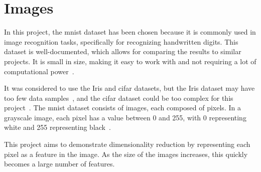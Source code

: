 \section{Images}\label{sec:images}
In this project, the \gls{mnist} dataset has been chosen because it is commonly used in image recognition tasks, specifically for recognizing handwritten digits. This dataset is well-documented, which allows for comparing the results to similar projects. It is small in size, making it easy to work with and not requiring a lot of computational power~\cite{lecun-mnist-database}.

It was considered to use the Iris and \gls{cifar} datasets, but the Iris dataset may have too few data samples~\cite{mnist-vs-iris}, and the \gls{cifar} dataset could be too complex for this project~\cite{fashion-mnist}. The \gls{mnist} dataset consists of images, each composed of pixels. In a grayscale image, each pixel has a value between 0 and 255, with 0 representing white and 255 representing black~\cite{lecun-mnist-database}.

This project aims to demonstrate dimensionality reduction by representing each pixel as a feature in the image. As the size of the images increases, this quickly becomes a large number of features.
